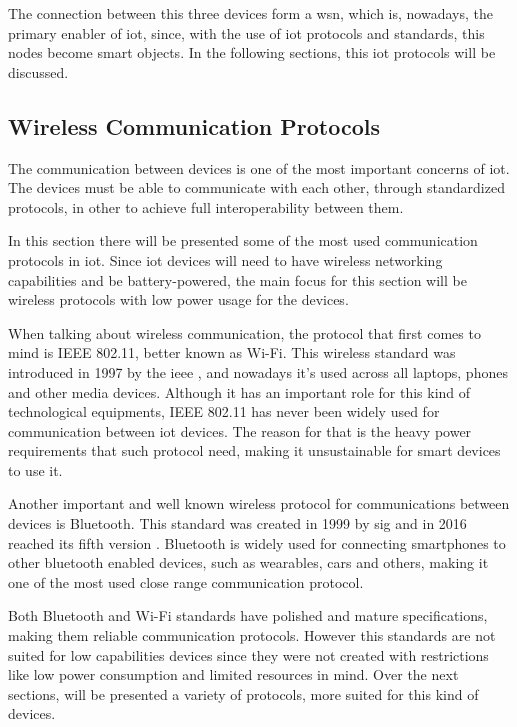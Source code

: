The connection between this three devices form a \ac{wsn}, which is, nowadays, the primary enabler of \ac{iot}, since, with the use of \ac{iot} protocols and standards, this nodes become smart objects. In the following sections, this \ac{iot} protocols will be discussed.




\subsection{Wireless Communication Protocols}

The communication between devices is one of the most important concerns of \ac{iot}. The devices must be able to communicate with each other, through standardized protocols, in other to achieve full interoperability between them. 

In this section there will be presented some of the most used communication protocols in \ac{iot}. Since \ac{iot} devices will need to have wireless networking capabilities and be battery-powered, the main focus for this section will be wireless protocols with low power usage for the devices.

When talking about wireless communication, the protocol that first comes to mind is IEEE 802.11, better known as Wi-Fi. This wireless standard was introduced in 1997 by the \acf{ieee} \cite{Bellis2017}, and nowadays it's used across all laptops, phones and other media devices. Although it has an important role for this kind of technological equipments, IEEE 802.11 has never been widely used for communication between \ac{iot} devices. The reason for that is the heavy power requirements that such protocol need, making it unsustainable for smart devices to use it.

Another important and well known wireless protocol for communications between devices is Bluetooth. This standard was created in 1999 by \acf{sig} and in 2016 reached its fifth version \cite{BluetoothSIG2016}. Bluetooth is widely used for connecting smartphones to other bluetooth enabled devices, such as wearables, cars and others, making it one of the most used close range communication protocol.

Both Bluetooth and Wi-Fi standards have polished and mature specifications, making them reliable communication protocols. However this standards are not suited for low capabilities devices since they were not created with restrictions like low power consumption and limited resources in mind. Over the next sections, will be presented a variety of protocols, more suited for this kind of devices.

